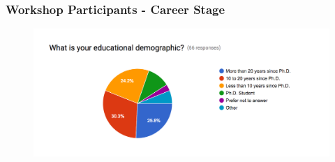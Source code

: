 \begin{frame}
\frametitle{Workshop Participants - Career Stage}

\begin{figure}[htbp]
\begin{center}
\includegraphics[width=1.0\textwidth]{images/s2i2-hep-cs-princeton-2-education.png}
\end{center}
\end{figure}

\end{frame}


